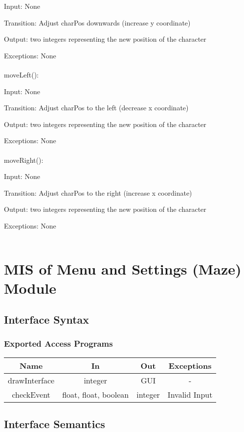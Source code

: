 \documentclass[12pt, titlepage]{article}
\begin{document}
		Input: None
		
		Transition: Adjust charPos downwards (increase y coordinate)
		
		Output: two integers representing the new position of the character
		
		Exceptions: None\\
		\\
		moveLeft():
		
		Input: None
		
		Transition: Adjust charPos to the left (decrease x coordinate)
		
		Output: two integers representing the new position of the character
		
		Exceptions: None\\
		\\
		moveRight():
		
		Input: None
		
		Transition: Adjust charPos to the right (increase x coordinate) 
		
		Output: two integers representing the new position of the character
		
		Exceptions: None\\
		\\
\section{MIS of Menu and Settings (Maze) Module}
		\subsection{Interface Syntax}
		\subsubsection{Exported Access Programs}
		\begin{tabular}[pos]{|c|c|c|c|}
			\hline
			\textbf{Name}& \textbf{In} & \textbf{Out} & \textbf{Exceptions} \\ \hline
			drawInterface & integer & GUI & - \\ \hline
			checkEvent & float, float, boolean & integer & Invalid Input \\ \hline
			
		\end{tabular}
		
		\subsection{Interface Semantics}
\end{document}
